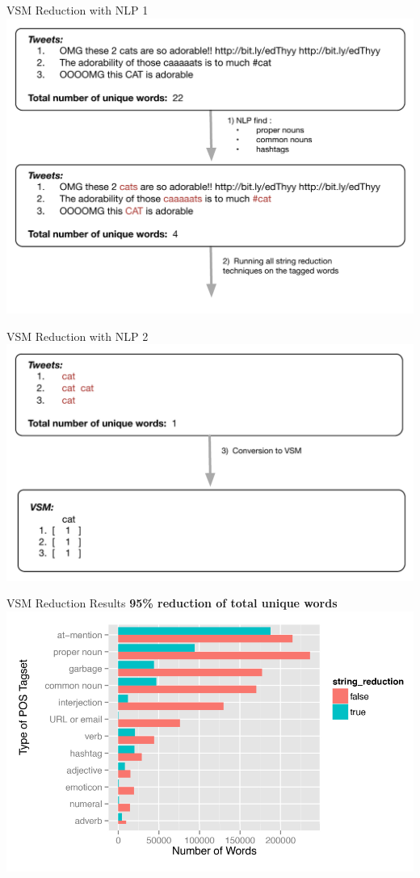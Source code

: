 \begin{frame}{VSM Reduction with NLP 1}
  \includegraphics[width=1\textwidth]{images/string_reduction_nlp_1}
\end{frame}

\begin{frame}{VSM Reduction with NLP 2}
  \includegraphics[width=1\textwidth]{images/string_reduction_nlp_2}
\end{frame}

\begin{frame}{VSM Reduction Results}
  \textbf{95\% reduction of total unique words}
  \includegraphics[width=1\textwidth]{images/plot_wordcount_nlp.pdf}
\end{frame}


